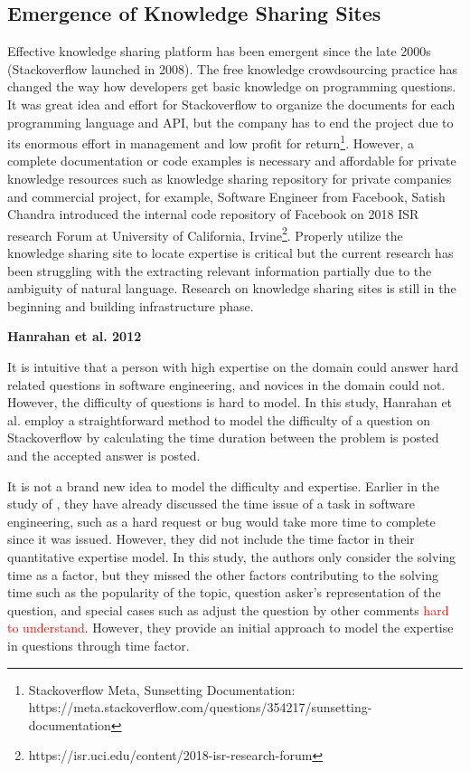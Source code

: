 \subsection{Emergence of Knowledge Sharing Sites}

Effective knowledge sharing platform has been emergent since the late 2000s (Stackoverflow launched in 2008). The free knowledge crowdsourcing practice has changed the way how developers get basic knowledge on programming questions. It was great idea and effort for Stackoverflow to organize the documents for each programming language and API, but the company has to end the project due to its enormous effort in management and low profit for return\footnote{Stackoverflow Meta, Sunsetting Documentation: https://meta.stackoverflow.com/questions/354217/sunsetting-documentation}. However, a complete documentation or code examples is necessary and affordable for private knowledge resources such as knowledge sharing repository for private companies and commercial project, for example, Software Engineer from Facebook, Satish Chandra introduced the internal code repository of Facebook on 2018 ISR research Forum at University of California, Irvine\footnote{https://isr.uci.edu/content/2018-isr-research-forum}. Properly utilize the knowledge sharing site to locate expertise is critical but the current research has been struggling with the extracting relevant information partially due to the ambiguity of natural language. Research on knowledge sharing sites is still in the beginning and building infrastructure phase.

\textbf{Hanrahan et al. 2012}

It is intuitive that a person with high expertise on the domain could answer hard related questions in software engineering, and novices in the domain could not. However, the difficulty of questions is hard to model. In this study, Hanrahan et al. employ a straightforward method to model the difficulty of a question on Stackoverflow by calculating the time duration between the problem is posted and the accepted answer is posted.

It is not a brand new idea to model the difficulty and expertise. Earlier in the study of \cite{mockus2002expertise}, they have already discussed the time issue of a task in software engineering, such as a hard request or bug would take more time to complete since it was issued. However, they did not include the time factor in their quantitative expertise model. In this study, the authors only consider the solving time as a factor, but they missed the other factors contributing to the solving time such as the popularity of the topic, question asker's representation of the question, and special cases such as adjust the question by other comments \textcolor{red}{hard to understand}. However, they provide an initial approach to model the expertise in questions through time factor.

